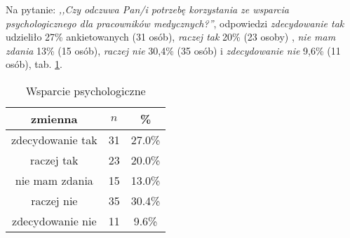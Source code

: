 Na pytanie: \textit{,,Czy odczuwa Pan/i potrzebę korzystania ze wsparcia psychologicznego dla pracowników medycznych?''}, odpowiedzi \textit{zdecydowanie tak} udzieliło 27\% ankietowanych (31 osób), \textit{raczej tak} 20\% (23 osoby) , \textit{nie mam zdania} 13\% (15 osób), \textit{raczej nie} 30,4\% (35 osób) i \textit{zdecydowanie nie} 9,6\% (11 osób), tab. \ref{tab:Q22}.


\begin{table}[H]
\caption{Wsparcie psychologiczne}
\centering
\begin{tabular}{ | c | c | c |}
\hline
zmienna & $n$ & \% \\
\hline
zdecydowanie tak  &  31  & 27.0\% \\
\hline
raczej tak  &  23  & 20.0\% \\
\hline
nie mam zdania  &  15  & 13.0\% \\
\hline
raczej nie  &  35  & 30.4\% \\
\hline
zdecydowanie nie  &  11  & 9.6\% \\
\hline
\end{tabular}
\label{tab:Q22}
\end{table}
